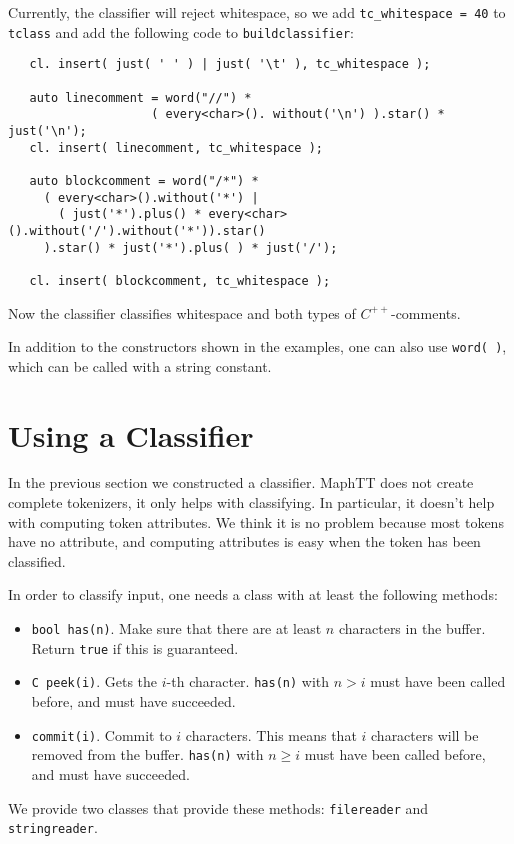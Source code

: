 \documentclass{article}
\begin{document}
   Currently, the classifier will reject whitespace,
   so we add \verb+tc_whitespace = 40+ to \verb+tclass+ and add
   the following code to \verb+buildclassifier+:
   \begin{verbatim}
   cl. insert( just( ' ' ) | just( '\t' ), tc_whitespace );

   auto linecomment = word("//") *
                    ( every<char>(). without('\n') ).star() * just('\n');
   cl. insert( linecomment, tc_whitespace );

   auto blockcomment = word("/*") *
     ( every<char>().without('*') |
       ( just('*').plus() * every<char>().without('/').without('*')).star()
     ).star() * just('*').plus( ) * just('/');

   cl. insert( blockcomment, tc_whitespace );  \end{verbatim}
   Now the classifier classifies whitespace and both types
   of $ C^{++} $-comments. 

   \noindent
   In addition to the constructors shown in the examples, one can also use
   \verb+word( )+, which can be called with a 
   string constant. 
\section{Using a Classifier}

In the previous section we constructed a classifier.
MaphTT does not create complete tokenizers, it only helps
with classifying. 
In particular, it doesn't help with computing token attributes.
We think it is no problem because most tokens have no attribute,
and computing attributes is easy when the token has been classified.

In order to classify input, one needs a class with at least the following 
methods:
\begin{itemize}
\item
   \verb+bool has(n)+. Make sure that there are at least
   $ n $ characters in the buffer. Return \verb+true+ if this 
   is guaranteed. 
\item
   \verb+C peek(i)+. Gets the $ i $-th character.
   \verb+has(n)+ with $ n > i $ must have been called before, 
   and must have succeeded. 
\item
   \verb+commit(i)+. Commit to $ i $ characters.
   This means that $ i $ characters will be removed from
   the buffer. 
   \verb+has(n)+ with $ n \geq i $ must have been called before, 
   and must have succeeded. 
\end{itemize}
We provide two classes that provide these methods: 
\verb+filereader+ and \verb+stringreader+.
\end{document}
